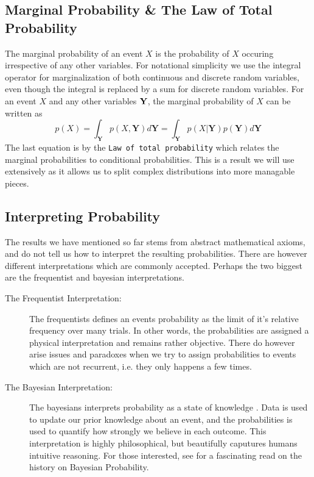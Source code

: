 \subsection{Marginal Probability \& The Law of Total Probability}
The marginal probability of an event $X$ is the probability of $X$ occuring irrespective of any other variables.
For notational simplicity we use the integral operator for marginalization of both continuous and discrete random variables, even though the integral is replaced by a sum for discrete random variables. For an event $X$ and any other variables $\bf Y$, the marginal probability of $X$ can be written as
\begin{equation}
    p(X) = \int_\mathbf{Y} p(X, \mathbf{Y}) d\mathbf{Y} = \int_\mathbf{Y} p(X | \mathbf{Y}) p(\mathbf{Y}) d\mathbf{Y}
\end{equation}
The last equation is by the \texttt{Law of total probability} which relates the marginal probabilities to conditional probabilities. This is a result we will use extensively as it allows us to split complex distributions into more managable pieces.

\subsection{Interpreting Probability}
The results we have mentioned so far stems from abstract mathematical axioms, and do not tell us how to interpret the resulting probabilities. There are however different interpretations which are commonly accepted. Perhaps the two biggest are the frequentist and bayesian interpretations. 

\begin{description}
    \item[The Frequentist Interpretation:] The frequentists defines an events probability as the limit of it's relative frequency over many trials. In other words, the probabilities are assigned a physical interpretation and remains rather objective. There do however arise issues and paradoxes when we try to assign probabilities to events which are not recurrent, i.e. they only happens a few times.
    \item[The Bayesian Interpretation:] The bayesians interprets probability as a state of knowledge \cite{Jaynes86bayesianmethods:}. Data is used to update our prior knowledge about an event, and the probabilities is used to quantify how strongly we believe in each outcome. This interpretation is highly philosophical, but beautifully caputures humans intuitive reasoning. For those interested, see \Cite{Jaynes86bayesianmethods:} for a fascinating read on the history on Bayesian Probability.
\end{description}

